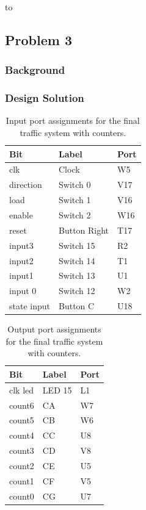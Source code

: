 to\documentclass[11pt]{article}
\begin{document}

\subsection{Problem 3}

\subsubsection{Background}


\subsubsection{Design Solution}


\begin{table}[H]
\begin{center}
\begin{tabular}{| l | l | l |}
	\hline
	Bit & Label & Port \\ \hline
	clk &  Clock & W5 \\ \hline
	direction & Switch 0 & V17 \\ \hline
	load & Switch 1 & V16 \\ \hline
	enable & Switch 2 & W16 \\ \hline
	reset & Button Right & T17 \\ \hline
	input3 & Switch 15 & R2 \\ \hline
	input2 & Switch 14 & T1 \\ \hline
	input1 & Switch 13 & U1 \\ \hline
	input 0 & Switch 12 & W2 \\ \hline
	state input & Button C & U18 \\ \hline
\end{tabular}
\caption{\label{tab:part3_input_Ports}Input port assignments for  the final traffic system with counters.}
\end{center}
\end{table}

\begin{table}[H]
\begin{center}
\begin{tabular}{| l | l | l |}
	\hline
	Bit & Label & Port \\ \hline
	clk led & LED 15 & L1 \\ \hline
	count6 & CA & W7 \\ \hline
	count5 & CB & W6 \\ \hline
	count4 & CC & U8 \\ \hline
	count3 & CD & V8 \\ \hline
	count2 & CE & U5 \\ \hline
	count1 & CF & V5 \\ \hline
	count0 & CG & U7 \\ \hline
\end{tabular}
\caption{\label{tab:part3_output_Ports}Output port assignments for the final traffic system with counters.}
\end{center}
\end{table}
\end{document}
